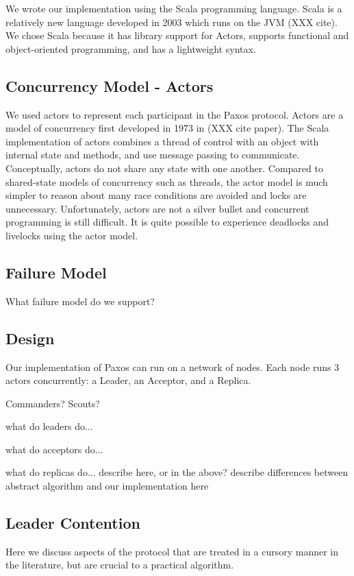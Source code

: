 \documentclass{sig-alternate}
\begin{document}
We wrote our implementation using the Scala programming language. Scala is a relatively new language developed in 2003 which runs on the JVM (XXX cite). We chose Scala because it has library support for Actors, supports functional and object-oriented programming, and has a lightweight syntax. 

\subsection{Concurrency Model - Actors}
We used actors to represent each participant in the Paxos protocol. Actors are a model of concurrency first developed in 1973 in (XXX cite paper). The Scala implementation of actors combines a thread of control with an object with internal state and methods, and use message passing to communicate. Conceptually, actors do not share any state with one another. Compared to shared-state models of concurrency such as threads, the actor model is much simpler to reason about many race conditions are avoided and locks are unnecessary. Unfortunately, actors are not a silver bullet and concurrent programming is still difficult. It is quite possible to experience deadlocks and livelocks using the actor model.

\subsection{Failure Model}
What failure model do we support?

\subsection{Design}
Our implementation of Paxos can run on a network of nodes. Each node runs 3 actors concurrently: a Leader, an Acceptor, and a Replica. 

Commanders? Scouts?

what do leaders do...

what do acceptors do...

what do replicas do...
describe here, or in the above?
describe differences between abstract algorithm and our implementation here

\subsection{Leader Contention}

Here we discuss aspects of the protocol that are treated in a cursory manner in the literature, but are crucial to a practical algorithm.
\end{document}
